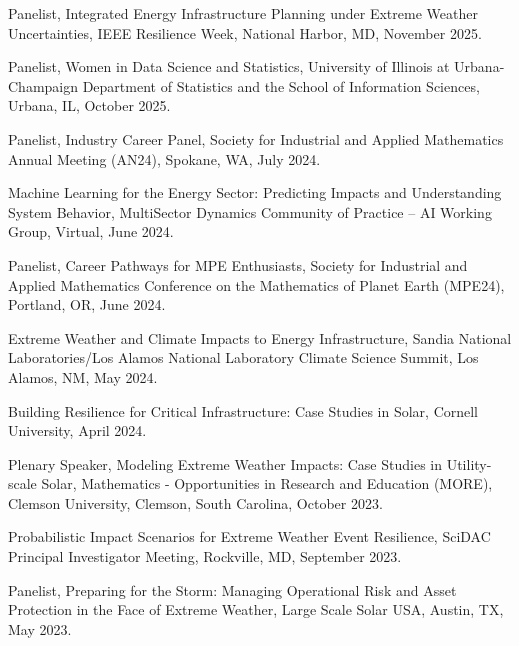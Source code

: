 \documentclass{article}[12pt]
\begin{document}
	\begin{etaremune}[]
		
		\item Panelist, Integrated Energy Infrastructure Planning under Extreme Weather Uncertainties, IEEE Resilience Week, National Harbor, MD, November 2025.
		
		\item Panelist, Women in Data Science and Statistics, University of Illinois at Urbana-Champaign Department of Statistics and the School of Information Sciences, Urbana, IL, October 2025. 
		
		\item Panelist, Industry Career Panel, Society for Industrial and Applied Mathematics Annual Meeting (AN24), Spokane, WA, July 2024.
		
		\item Machine Learning for the Energy Sector: Predicting Impacts and Understanding System Behavior, MultiSector Dynamics Community of Practice -- AI Working Group, Virtual, June 2024.
		
		\item Panelist, Career Pathways for MPE Enthusiasts, Society for Industrial and Applied Mathematics Conference on the Mathematics of Planet Earth (MPE24), Portland, OR, June 2024.
		
		\item Extreme Weather and Climate Impacts to Energy Infrastructure, Sandia National Laboratories/Los Alamos National Laboratory Climate Science Summit, Los Alamos, NM, May 2024. 
		
		\item Building Resilience for Critical Infrastructure: Case Studies in Solar, Cornell University, April 2024.
		
		\item Plenary Speaker, Modeling Extreme Weather Impacts: Case Studies in Utility-scale Solar, Mathematics - Opportunities in Research and Education (MORE), Clemson University, Clemson, South Carolina, October 2023.
		
		\item Probabilistic Impact Scenarios for Extreme Weather Event Resilience, SciDAC Principal Investigator Meeting, Rockville, MD, September 2023.
		
		\item Panelist, Preparing for the Storm: Managing Operational Risk and Asset Protection in the Face of Extreme Weather, Large Scale Solar USA, Austin, TX, May 2023.
		

\end{etaremune}
\end{document}

